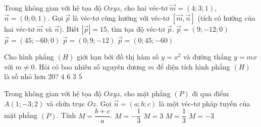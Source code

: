 \begin{ex}%
Trong không gian với hệ tọa độ $Oxyz$, cho hai véc-tơ $\vec{m} = (4;3;1)$, $\vec{n} = (0;0;1)$. Gọi $\vec{p}$ là véc-tơ cùng hướng với véc-tơ $\left[\vec{m},\vec{n}\right]$ (tích có hướng của hai véc-tơ $\vec{m}$ và $\vec{n}$). Biết $|\vec{p}| = 15$, tìm tọa độ véc-tơ $\vec{p}$.
\choice
{\True $\vec{p} = (9;-12;0)$}
{$\vec{p} = (45;-60;0)$}
{$\vec{p} = (0;9;-12)$}
{$\vec{p} = (0;45;-60)$}
\end{ex}

\begin{ex}%
Cho hình phẳng $(H)$ giới hạn bởi đồ thị hàm số $y = x^2$ và đường thẳng $y = mx$ với $m \neq 0$. Hỏi có bao nhiêu số nguyên dương $m$ để diện tích hình phẳng $(H)$ là số nhỏ hơn $20$?
\choice
{\True $4$}
{$6$}
{$3$}
{$5$}
\end{ex}

\begin{ex}%
Trong không gian với hệ tọa độ $Oxyz$, cho mặt phẳng $(P)$ đi qua điểm $A(1;-3;2)$ và chứa trục $Oz$. Gọi $\vec{n} = (a;b;c)$ là một véc-tơ pháp tuyến của mặt phẳng $(P)$. Tính $M = \dfrac{b + c}{a}$.
\choice
{$M = -\dfrac{1}{3}$}
{$M = 3$}
{\True $M = \dfrac{1}{3}$}
{$M = -3$}
\end{ex}

